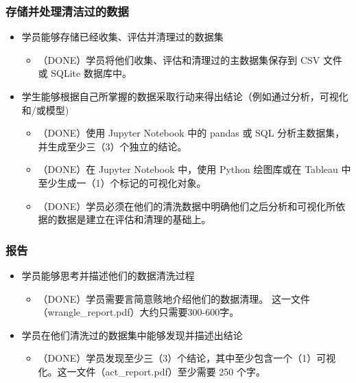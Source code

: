 \documentclass[11pt]{article}
\providecommand{\tightlist}{%
      \setlength{\itemsep}{0pt}\setlength{\parskip}{0pt}}
\begin{document}
\hypertarget{ux5b58ux50a8ux5e76ux5904ux7406ux6e05ux6d01ux8fc7ux7684ux6570ux636e}{%
\subsubsection{存储并处理清洁过的数据}\label{ux5b58ux50a8ux5e76ux5904ux7406ux6e05ux6d01ux8fc7ux7684ux6570ux636e}}

\begin{itemize}
\tightlist
\item
  学员能够存储已经收集、评估并清理过的数据集

  \begin{itemize}
  \tightlist
  \item
    （DONE）学员将他们收集、评估和清理过的主数据集保存到 CSV 文件或
    SQLite 数据库中。
  \end{itemize}
\item
  学生能够根据自己所掌握的数据采取行动来得出结论（例如通过分析，可视化和/或模型)

  \begin{itemize}
  \tightlist
  \item
    （DONE）使用 Jupyter Notebook 中的 pandas 或 SQL
    分析主数据集，并生成至少三（3）个独立的结论。
  \item
    （DONE）在 Jupyter Notebook 中，使用 Python 绘图库或在 Tableau
    中至少生成一（1）个标记的可视化对象。
  \item
    （DONE）学员必须在他们的清洗数据中明确他们之后分析和可视化所依据的数据是建立在评估和清理的基础上。
  \end{itemize}
\end{itemize}

\hypertarget{ux62a5ux544a}{%
\subsubsection{报告}\label{ux62a5ux544a}}

\begin{itemize}
\tightlist
\item
  学员能够思考并描述他们的数据清洗过程

  \begin{itemize}
  \tightlist
  \item
    （DONE）学员需要言简意赅地介绍他们的数据清理。
    这一文件（wrangle\_report.pdf）大约只需要300-600字。
  \end{itemize}
\item
  学员在他们清洗过的数据集中能够发现并描述出结论

  \begin{itemize}
  \tightlist
  \item
    （DONE）学员发现至少三（3）个结论，其中至少包含一个（1）可视化。这一文件（act\_report.pdf）至少需要
    250 个字。
  \end{itemize}
\end{itemize}
\end{document}
